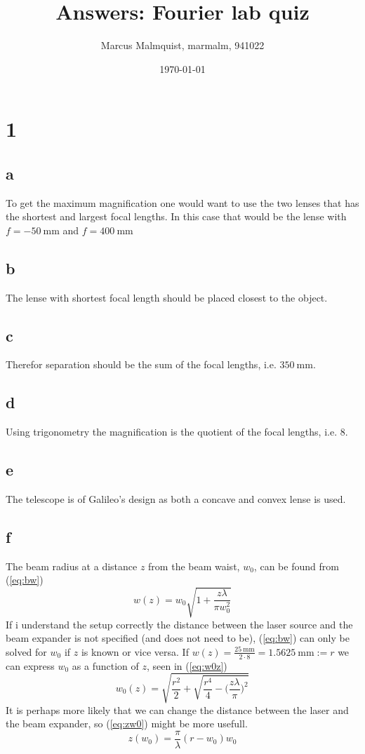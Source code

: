 \documentclass[12pt,a4paper]{article}
\title{Answers: Fourier lab quiz}
\author{Marcus Malmquist, marmalm, 941022}
\date{\today}
\begin{document}
\maketitle

\section{1}\label{sec:1}
\subsection{a}\label{sec:1a}
To get the maximum magnification one would want to use the two lenses that has the shortest and largest focal lengths. In this case that would be the lense with $f=\SI{-50}{\milli\metre}$ and $f=\SI{400}{\milli\metre}$
\subsection{b}\label{sec:1b}
The lense with shortest focal length should be placed closest to the object.
\subsection{c}\label{sec:1c}
Therefor separation should be the sum of the focal lengths, i.e. $\SI{350}{\milli\metre}$.
\subsection{d}\label{sec:1d}
Using trigonometry the magnification is the quotient of the focal lengths, i.e. $8$.
\subsection{e}\label{sec:1e}
The telescope is of Galileo's design as both a concave and convex lense is used.
\subsection{f}\label{sec:1f}
The beam radius at a distance $z$ from the beam waist, $w_0$, can be found from (\ref{eq:bw})
\begin{equation}
  \label{eq:bw}
  w(z)=w_0\sqrt{1+\frac{z\lambda}{\pi w_0^2}}
\end{equation}
If i understand the setup correctly the distance between the laser source and the beam expander is not specified (and does not need to be), (\ref{eq:bw}) can only be solved for $w_0$ if $z$ is known or vice versa. If $w(z)=\frac{\SI{25}{\milli\metre}}{2\cdot 8}=\SI{1.5625}{\milli\metre} := r$ we can express $w_0$ as a function of $z$, seen in (\ref{eq:w0z})
\begin{equation}
  \label{eq:w0z}
  w_0(z)=\sqrt{\frac{r^2}{2}+\sqrt{\frac{r^4}{4}-\Big(\frac{z\lambda}{\pi}\Big)^2}}
\end{equation}
It is perhaps more likely that we can change the distance between the laser and the beam expander, so (\ref{eq:zw0}) might be more usefull.
\begin{equation}
  \label{eq:zw0}
  z(w_0)=\frac{\pi}{\lambda}(r-w_0)w_0
\end{equation}
\end{document}
